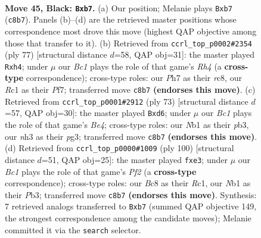 \documentclass[11pt]{article}
\begin{document}
\clearpage

\begin{figure}[p]\centering
\begin{subfigure}{0.46\textwidth}\centering
\resizebox{\linewidth}{!}{%
\newchessgame
\chessboard[
  setfen={2b3k1/1Q3p1p/6p1/4Pp2/B4P2/7N/P4KPP/1nr5 b - - 2 45},
  showmover=false,
  pgfstyle=straightmove, color=movearrow, markmove={c8-b7}
]}
\caption{}
\end{subfigure}\hfill
\begin{subfigure}{0.46\textwidth}\centering
\resizebox{\linewidth}{!}{%
\newchessgame
\chessboard[
  setfen={2R5/5pk1/4pp2/p6r/Pp1P3Q/1P3P2/6P1/6K1 b - - 0 39},
  showmover=false,
  pgfstyle=straightmove, color=movearrow, markmove={h5-h4}
]}
\caption{}
\end{subfigure}
\\[4pt]
\begin{subfigure}{0.46\textwidth}\centering
\resizebox{\linewidth}{!}{%
\newchessgame
\chessboard[
  setfen={8/7k/3Q2p1/p2Pbp1p/8/1P2P1PP/r7/3R1NK1 b - - 0 37},
  showmover=false,
  pgfstyle=straightmove, color=movearrow, markmove={e5-d6}
]}
\caption{}
\end{subfigure}\hfill
\begin{subfigure}{0.46\textwidth}\centering
\resizebox{\linewidth}{!}{%
\newchessgame
\chessboard[
  setfen={3r2k1/5pp1/p4n1p/8/N1P5/1P2q1PP/5P1K/2R5 w - - 0 51},
  showmover=false,
  pgfstyle=straightmove, color=movearrow, markmove={f2-e3}
]}
\caption{}
\end{subfigure}
\caption{\textbf{Move 45, Black: \texttt{Bxb7}.} (a) Our position; Melanie plays \texttt{Bxb7} (\texttt{c8b7}). Panels (b)--(d) are the retrieved master positions whose correspondence most drove this move (highest QAP objective among those that transfer to it). (b) Retrieved from \texttt{ccrl\_top\_p0002\#2354} (ply 77) [structural distance $d$=58, QAP obj=31]: the master played \texttt{Rxh4}; under $\mu$ our \emph{Bc1} plays the role of that game's \emph{Rh4} (a \textbf{cross-type} correspondence); cross-type roles: our \emph{P}h7 as their \emph{r}c8, our \emph{R}c1 as their \emph{P}f7; transferred move \texttt{c8b7} \textbf{(endorses this move)}. (c) Retrieved from \texttt{ccrl\_top\_p0001\#2912} (ply 73) [structural distance $d$=57, QAP obj=30]: the master played \texttt{Bxd6}; under $\mu$ our \emph{Bc1} plays the role of that game's \emph{Be4}; cross-type roles: our \emph{N}b1 as their \emph{p}b3, our \emph{n}h3 as their \emph{p}g3; transferred move \texttt{c8b7} \textbf{(endorses this move)}. (d) Retrieved from \texttt{ccrl\_top\_p0000\#1009} (ply 100) [structural distance $d$=51, QAP obj=25]: the master played \texttt{fxe3}; under $\mu$ our \emph{Bc1} plays the role of that game's \emph{Pf2} (a \textbf{cross-type} correspondence); cross-type roles: our \emph{B}c8 as their \emph{R}c1, our \emph{N}b1 as their \emph{P}b3; transferred move \texttt{c8b7} \textbf{(endorses this move)}. Synthesis: 7 retrieved analogs transferred to \texttt{Bxb7} (summed QAP objective 149, the strongest correspondence among the candidate moves); Melanie committed it via the \texttt{search} selector.}
\label{fig:thought-m89}
\end{figure}
\end{document}
